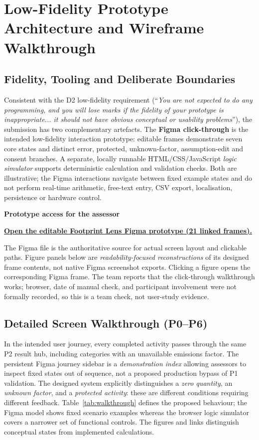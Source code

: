 \documentclass[12pt,a4paper]{article}
\begin{document}
\section{Low-Fidelity Prototype Architecture and Wireframe Walkthrough}

\subsection{Fidelity, Tooling and Deliberate Boundaries}
Consistent with the D2 low-fidelity requirement (``\emph{You are not expected to do any programming, and you will lose marks if the fidelity of your prototype is inappropriate... it should not have obvious conceptual or usability problems}''), the submission has two complementary artefacts. The \textbf{Figma click-through} is the intended low-fidelity interaction prototype: editable frames demonstrate seven core states and distinct error, protected, unknown-factor, assumption-edit and consent branches. A separate, locally runnable HTML/CSS/JavaScript \emph{logic simulator} supports deterministic calculation and validation checks. Both are illustrative; the Figma interactions navigate between fixed example states and do not perform real-time arithmetic, free-text entry, CSV export, localisation, persistence or hardware control.

\begin{keybox}
\textbf{\sffamily\color{Navy}Prototype access for the assessor}\par
\href{https://www.figma.com/design/L1kEH28shvU8494m2Y7EnT}{\sffamily\bfseries\color{Teal}Open the editable Footprint Lens Figma prototype (21 linked frames).}\par
The Figma file is the authoritative source for actual screen layout and clickable paths. Figure panels below are \emph{readability-focused reconstructions} of its designed frame contents, not native Figma screenshot exports. Clicking a figure opens the corresponding Figma frame. The team reports that the click-through walkthrough works; browser, date of manual check, and participant involvement were not formally recorded, so this is a team check, not user-study evidence.
\end{keybox}

\subsection{Detailed Screen Walkthrough (P0--P6)}
In the intended user journey, every completed activity passes through the same P2 result hub, including categories with an unavailable emissions factor. The persistent Figma journey sidebar is a \emph{demonstration index} allowing assessors to inspect fixed states out of sequence, not a proposed production bypass of P1 validation. The designed system explicitly distinguishes a \emph{zero quantity}, an \emph{unknown factor}, and a \emph{protected activity}: these are different conditions requiring different feedback. Table~\ref{tab:walkthrough} defines the proposed behaviour; the Figma model shows fixed scenario examples whereas the browser logic simulator covers a narrower set of functional controls. The figures and links distinguish conceptual states from implemented calculations.
\end{document}
